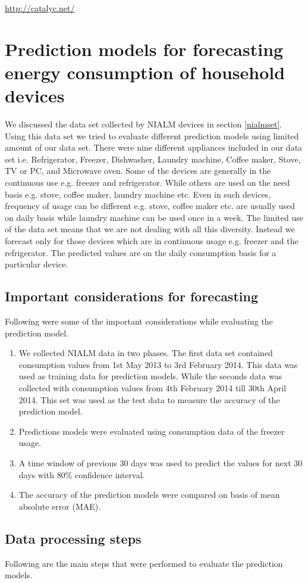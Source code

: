 \url{http://catalyc.net/}

\section{Prediction models for forecasting energy consumption of household devices}
We discussed the data set collected by NIALM devices in section \ref{nialmset}. Using this data set we tried to evaluate different prediction models using limited amount of our data set. There were nine different appliances included in our data set i.e. Refrigerator, Freezer, Dishwasher, Laundry machine, Coffee maker, Stove, TV or PC, and Microwave oven. Some of the devices are generally in the continuous use e.g. freezer and refrigerator. While others are used on the need basis e.g. stove, coffee maker, laundry machine etc. Even in such devices, frequency of usage can be different e.g. stove, coffee maker etc. are usually used on daily basis while laundry machine can be used once in a week. The limited use of the data set means that we are not dealing with all this diversity. Instead we forecast only for those devices which are in continuous usage e.g. freezer and the refrigerator. The predicted values are on the daily consumption basis for a particular device.  
\subsection{Important considerations for forecasting}
Following were some of the important considerations while evaluating the prediction model.
\begin{enumerate}
\item We collected NIALM data in two phases. The first data set contained consumption values from 1st May 2013 to 3rd February 2014. This data was used as training data for prediction models. While the seconds data was collected with consumption values from 4th February 2014 till 30th April 2014. This set was used as the test data to measure the accuracy of the prediction model.
\item Predictions models were evaluated using consumption data of the freezer usage.
\item A time window of previous 30 days was used to predict the values for next 30 days with 80\% confidence interval.
\item  The accuracy of the prediction models were compared on basis of mean absolute error (MAE).
\end{enumerate}     

\subsection{Data processing steps}
Following are the main steps that were performed to evaluate the prediction models.

